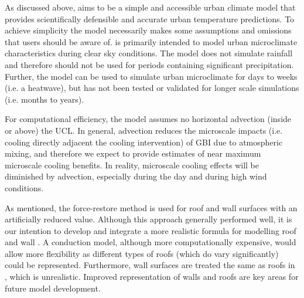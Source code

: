 \documentclass[final,3p,times,authoryear]{elsarticle}
\begin{document}

As discussed above,  aims to be a simple and accessible urban climate model that provides scientifically defensible and accurate urban temperature predictions. To achieve simplicity the model necessarily makes some  assumptions and omissions that users should be aware of.    is primarily intended to model urban microclimate characteristics during clear sky conditions. The model does not simulate rainfall and therefore should not be used for periods containing significant precipitation. Further, the model can be used to simulate urban microclimate for days to weeks (i.e. a heatwave), but has not been tested or validated for longer scale simulations (i.e. months to years). 

For computational efficiency, the model assumes no horizontal advection (inside or above) the UCL. In general, advection reduces the microscale impacts (i.e. cooling directly adjacent the cooling intervention) of GBI due to atmospheric mixing, and therefore we expect  to provide estimates of near maximum microscale cooling benefits. In reality, microscale cooling effects will be diminished by advection, especially during the day and during high wind conditions.

As mentioned, the force-restore method is used for roof and wall surfaces with an artificially reduced  value. Although this approach generally performed well, it is our intention to develop and integrate a more realistic formula for modelling roof and wall . A conduction model, although more computationally expensive, would allow more flexibility as different types of roofs (which do vary significantly) could be represented. Furthermore, wall surfaces are treated the same as roofs in , which is unrealistic. Improved representation of walls and roofs are key areas for future model development.  


\end{document}
